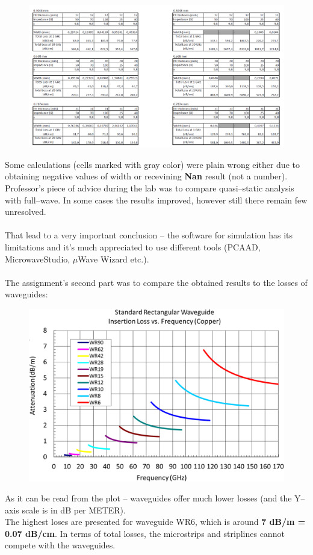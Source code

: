 \documentclass[eng,printmode]{mgr}
\begin{document}
\newpage
\begin{figure}[h]
	\centering
	\includegraphics[width=1\linewidth]{microm2}
	\label{fig:microm2}
\end{figure}
\noindent
Some calculations (cells marked with gray color) were plain wrong either due to obtaining negative values of width or recevining \textbf{Nan} result (not a number).\\
Professor's piece of advice during the lab was to compare quasi--static analysis with full--wave. In some cases the results improved, however still there remain few unresolved.\\
\\
That lead to a very important conclusion -- the software for simulation has its limitations and it's much appreciated to use different tools (PCAAD, MicrowaveStudio, $\mu$Wave Wizard etc.).\\
\\
The assignment's second part was to compare the obtained results to the losses of waveguides:
\begin{figure}[h]
	\centering
	\includegraphics[width=0.6\linewidth]{waveguides}
	\label{fig:waveguides}
\end{figure}

\noindent
As it can be read from the plot -- waveguides offer much lower losses (and the Y--axis scale is in dB per METER).\\
The highest loses are presented for waveguide WR6, which is around \textbf{7 dB/m = 0.07 dB/cm}.
In terms of total losses, the microstrips and striplines cannot compete with the waveguides. 
\newpage
\end{document}
